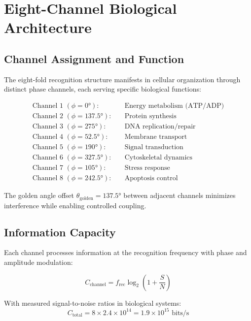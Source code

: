 \documentclass[12pt,twocolumn]{article}
\begin{document}
\section{Eight-Channel Biological Architecture}

\subsection{Channel Assignment and Function}

The eight-fold recognition structure manifests in cellular organization through distinct phase channels, each serving specific biological functions:

\begin{align}
\text{Channel 1 } (\phi = 0°): &\quad \text{Energy metabolism (ATP/ADP)} \\
\text{Channel 2 } (\phi = 137.5°): &\quad \text{Protein synthesis} \\
\text{Channel 3 } (\phi = 275°): &\quad \text{DNA replication/repair} \\
\text{Channel 4 } (\phi = 52.5°): &\quad \text{Membrane transport} \\
\text{Channel 5 } (\phi = 190°): &\quad \text{Signal transduction} \\
\text{Channel 6 } (\phi = 327.5°): &\quad \text{Cytoskeletal dynamics} \\
\text{Channel 7 } (\phi = 105°): &\quad \text{Stress response} \\
\text{Channel 8 } (\phi = 242.5°): &\quad \text{Apoptosis control}
\end{align}

The golden angle offset $\theta_{\text{golden}} = 137.5°$ between adjacent channels minimizes interference while enabling controlled coupling.

\subsection{Information Capacity}

Each channel processes information at the recognition frequency with phase and amplitude modulation:

\begin{equation}
C_{\text{channel}} = f_{\text{rec}} \log_2\left(1 + \frac{S}{N}\right)
\end{equation}

With measured signal-to-noise ratios in biological systems:
\begin{equation}
C_{\text{total}} = 8 \times 2.4 \times 10^{14} = 1.9 \times 10^{15} \text{ bits/s}
\end{equation}
\end{document}
